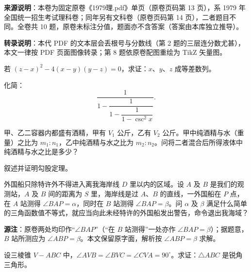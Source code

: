 

\begin{gktip}
\textbf{来源说明}：本卷为固定原卷《1979理.pdf》单页（原卷页码第 13 页），系 1979 年全国统一招生考试理科卷；同年另有文科卷（原卷页码第 14 页），二者题目不同。全卷共 10 题，原卷未标注分值，题面亦不含答案（答案由本库独立推导）。

\textbf{转录说明}：本代 PDF 的文本层会丢根号与分数线（第 2 题的三层连分数尤甚），本文一律按 PDF 页面图像转录；第 8 题依原卷配图重绘为 TikZ 矢量图。
\end{gktip}

\begin{question}
若 $(z-x)^2-4(x-y)(y-z)=0$，求证：$x$、$y$、$z$ 成等差数列。

\end{question}
\begin{question}
化简：
\nopagebreak[4]
\[
\frac{1}{1-\dfrac{1}{1-\dfrac{1}{1-\csc^2x}}}.
\]

\end{question}
\begin{question}
甲、乙二容器内都盛有酒精，甲有 $V_1$ 公斤，乙有 $V_2$ 公斤。甲中纯酒精与水（重量）之比为 $m_1:n_1$，乙中纯酒精与水之比为 $m_2:n_2$。问将二者混合后所得液体中纯酒精与水之比是多少？

\end{question}
\begin{question}
叙述并证明勾股定理。

\end{question}
\begin{question}
外国船只除特许外不得进入离我海岸线 $D$ 里以内的区域。设 $A$ 及 $B$ 是我们的观测站，$A$ 及 $B$ 间的距离为 $S$ 里，海岸线是过 $A$、$B$ 的直线，一外国船在 $P$ 点，在 $A$ 站测得 $\angle BAP=\alpha$，同时在 $B$ 站测得 $\angle BAP=\beta$。问 $\alpha$ 及 $\beta$ 满足什么简单的三角函数值不等式，就应当向此未经特许的外国船发出警告，命令退出我海域？

\begin{gktip}
\textbf{源注}：原卷两处均印作“$\angle BAP$”（“在 $B$ 站测得”一处亦作 $\angle BAP=\beta$）；据题意，$B$ 站所测应为 $\angle ABP=\beta$。本文保留原字面，解析按 $\angle ABP=\beta$ 求解。
\end{gktip}

\end{question}
\begin{question}
设三棱锥 $V-ABC$ 中，$\angle AVB=\angle BVC=\angle CVA=90^\circ$。求证：$\triangle ABC$ 是锐角三角形。

\end{question}
